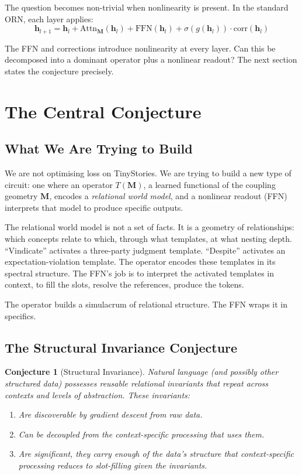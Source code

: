 \documentclass[11pt, a4paper]{article}
\newcommand{\M}{\mathbf{M}}
\newcommand{\h}{\mathbf{h}}
\theoremstyle{plain}
\newtheorem{conjecture}{Conjecture}
\theoremstyle{definition}
\theoremstyle{remark}
\begin{document}
The question becomes non-trivial when nonlinearity is present.
In the standard ORN, each layer applies:
\begin{equation}
\h_{l+1} = \h_l + \text{Attn}_\M(\h_l) + \text{FFN}(\h_l) + \sigma(g(\h_l)) \cdot \text{corr}(\h_l)
\end{equation}

The FFN and corrections introduce nonlinearity at every layer.
Can this be decomposed into a dominant operator plus a nonlinear readout?
The next section states the conjecture precisely.


\section{The Central Conjecture}
\label{sec:central-conjecture}

\subsection{What We Are Trying to Build}

We are not optimising loss on TinyStories.
We are trying to build a new type of circuit: one where an operator $T(\M)$, a learned functional of the coupling geometry $\M$, encodes a \emph{relational world model}, and a nonlinear readout (FFN) interprets that model to produce specific outputs.

The relational world model is not a set of facts.
It is a geometry of relationships: which concepts relate to which, through what templates, at what nesting depth.
``Vindicate'' activates a three-party judgment template.
``Despite'' activates an expectation-violation template.
The operator encodes these templates in its spectral structure.
The FFN's job is to interpret the activated templates in context, to fill the slots, resolve the references, produce the tokens.

The operator builds a simulacrum of relational structure.
The FFN wraps it in specifics.

\subsection{The Structural Invariance Conjecture}

\begin{conjecture}[Structural Invariance]
\label{conj:structural}
Natural language (and possibly other structured data) possesses reusable relational invariants that repeat across contexts and levels of abstraction.
These invariants:
\begin{enumerate}[nosep]
\item Are discoverable by gradient descent from raw data.
\item Can be decoupled from the context-specific processing that uses them.
\item Are significant, they carry enough of the data's structure that context-specific processing reduces to slot-filling given the invariants.
\end{enumerate}
\end{conjecture}
\end{document}
